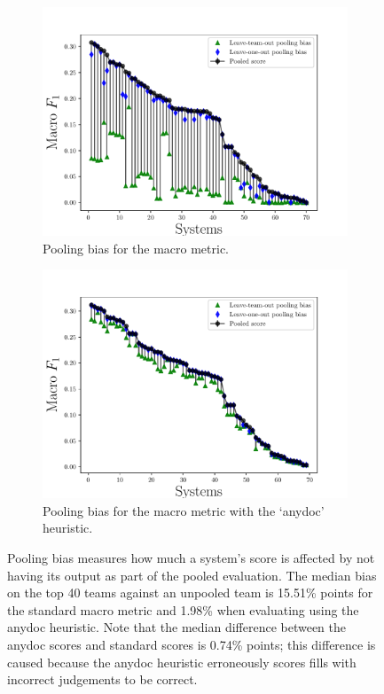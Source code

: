 \begin{figure}
  \begin{subfigure}{\columnwidth}
  \includegraphics[width=\columnwidth]{figures/pooling-bias}
  \caption{\label{fig:pooling-bias} Pooling bias for the macro \fone{} metric.}
  \end{subfigure}
  \begin{subfigure}{\columnwidth}
  \includegraphics[width=\columnwidth]{figures/pooling-bias-anydoc}
  \caption{\label{fig:pooling-bias-anydoc} Pooling bias for the macro \fone{} metric with the `anydoc' heuristic.}
  \end{subfigure}
  \caption{Pooling bias measures how much a system's score is affected by not having its output as part of the pooled evaluation.
  The median bias on the top 40 teams against an unpooled team is 15.51\% points for the standard macro \fone{} metric and 1.98\% when evaluating using the anydoc heuristic.
  Note that the median difference between the anydoc scores and standard scores is 0.74\% points; this difference is caused because the anydoc heuristic erroneously scores fills with incorrect judgements to be correct.}
\end{figure}

